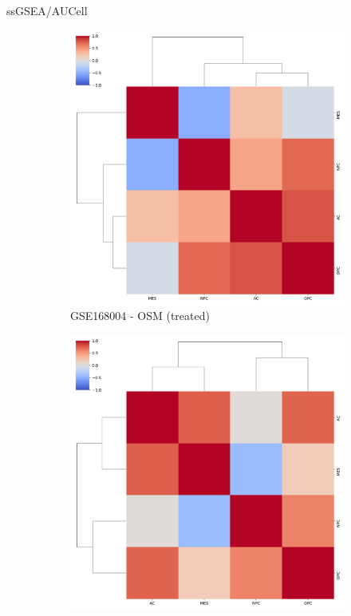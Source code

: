\documentclass[aspectratio=169,9pt]{beamer}
\begin{document}
    \begin{frame}{ssGSEA/AUCell}
        \begin{adjustwidth}{-5cm}{-5cm}
            \centering
            \begin{figure}\ContinuedFloat
                \centering
                \begin{subfigure}[b]{0.38\textwidth}
                    \centering
                    \includegraphics[width=\textwidth]{AUCell_OSM_celllines_corrplot_4D}
                    \caption{GSE168004 - OSM (treated)}
                \end{subfigure}
                \begin{subfigure}[b]{0.38\textwidth}
                    \centering
                    \includegraphics[width=\textwidth]{AUCell_mgg23_corrplot_4D}

\end{subfigure}
\end{figure}
\end{adjustwidth}
\end{frame}
\end{document}
